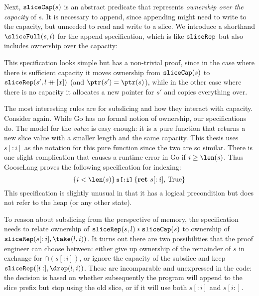 
Next, $\sliceCap(s)$ is an abstract predicate that represents
\emph{ownership over the capacity} of $s$. It is necessary to append,
since appending might need to write to the capacity, but unneeded to
read and write to a slice. We introduce a shorthand
$\sliceFull(s, l)$ for the append specification, which is like $\sliceRep$ but also
includes ownership over the capacity:
%
\begin{mathpar}

\end{mathpar}

This specification looks simple but has a non-trivial proof, since in the case
where there is sufficient capacity it moves ownership from $\sliceCap(s)$ to
$\sliceRep(s', l \lappend [x])$ (and $\ptr(s') = \ptr(s)$), while in the other
case where there is no capacity it allocates a new pointer for $s'$ and copies
everything over.

The most interesting rules are for subslicing and how they interact with
capacity. Consider  again. While Go has no formal
notion of ownership, our specifications do. The model for the
\emph{value}  is easy enough: it is a pure function that returns a new slice value
with a smaller length and the same capacity. This thesis uses $s[:i]$ as the
notation for this pure function since the two are so similar. There is one slight complication that
 causes a runtime error in Go if $i \geq \len(s)$. Thus GooseLang
proves the following specification for indexing:
\[
  \hoare{i < \len(s)}{\cc{s[:i]}}{\Ret{s[:i]} \TRUE}
\]
This specification is slightly unusual in that it has a logical precondition but
does not refer to the heap (or any other state).

To reason about subslicing from the perspective of memory, the specification
needs to relate ownership of
$\sliceRep(s, l) * \sliceCap(s)$ to ownership of
$\sliceRep(s[:i], \take(l, i))$. It turns out there are two
possibilities that the proof engineer can choose between: either give up ownership of the remainder of $s$
in exchange for $\cap(s[:i])$, or ignore the
capacity of the subslice and keep
$\sliceRep([i:], \drop(l, i))$. These are incomparable and
unexpressed in the code: the decision is based on whether subsequently the program will
append to the slice prefix but stop using the old slice, or if it will use both
$s[:i]$ and $s[i:]$.

